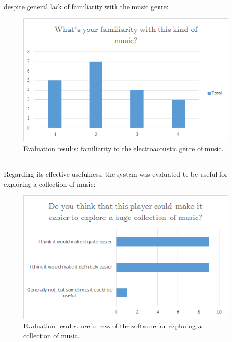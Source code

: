 despite general lack of familiarity with the music genre: \\
\begin{figure}[h]
\begin{center}
\includegraphics[scale=0.5]{Figures/musicfamiliarity.png}
  \caption[Evaluation results: familiarity to the electroacoustic genre of music]{Evaluation results: familiarity to the electroacoustic genre of music.}
\end{center}
\end{figure}
\\

Regarding its effective usefulness, the system was evaluated to be useful for exploring a collection of music: \\
\begin{figure}[h]
\begin{center}
\includegraphics[scale=0.5]{Figures/usage.png}
  \caption[Evaluation results: usefulness of the software for exploring a collection of music]{Evaluation results: usefulness of the software for exploring a collection of music.}
\end{center}
\end{figure}
\\

